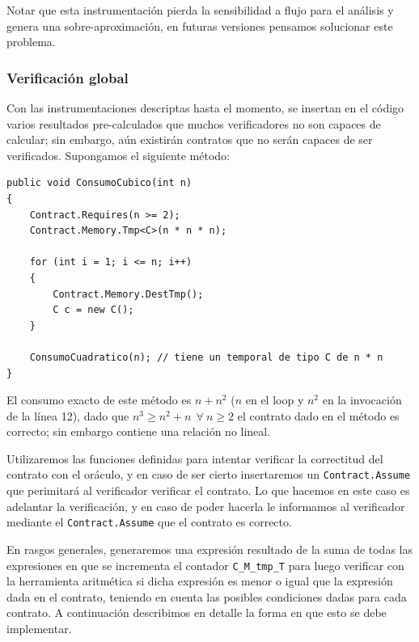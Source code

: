 \documentclass[12pt,a4paper]{article}
\newcommand\mono[1]{\texttt{#1}}
\begin{document}
				Notar que esta instrumentación pierda la sensibilidad a flujo para el análisis y genera una sobre-aproximación, en futuras versiones pensamos solucionar este problema.

			\subsubsection{Verificación global}
				Con las instrumentaciones descriptas hasta el momento, se insertan en el código varios resultados pre-calculados que muchos verificadores no son capaces de calcular; sin embargo, aún existirán contratos que no serán capaces de ser verificados. Supongamos el siguiente método:

				\vspace{15pt}
				\begin{small}
				\begin{lstlisting}[caption=Ejemplo de contrato no verificable por Code Contracts]
public void ConsumoCubico(int n)
{
	Contract.Requires(n >= 2);
	Contract.Memory.Tmp<C>(n * n * n);

	for (int i = 1; i <= n; i++)
	{
		Contract.Memory.DestTmp();
		C c = new C();
	}

	ConsumoCuadratico(n); // tiene un temporal de tipo C de n * n
}
				\end{lstlisting}
				\end{small}

				El consumo exacto de este método es $n + n^2$ ($n$ en el loop y $n^2$ en la invocación de la línea 12), dado que $n^3 \geq n^2 + n\ \ \forall\ n \geq 2$ el contrato dado en el método es correcto; sin embargo contiene una relación no lineal.

				Utilizaremos las funciones definidas para intentar verificar la correctitud del contrato con el oráculo, y en caso de ser cierto insertaremos un \mono{Contract.Assume} que perimitará al verificador verificar el contrato. Lo que hacemos en este caso es adelantar la verificación, y en caso de poder hacerla le informamos al verificador mediante el \mono{Contract.Assume} que el contrato es correcto.

				En rasgos generales, generaremos una expresión resultado de la suma de todas las expresiones en que se incrementa el contador \mono{C\_M\_tmp\_T} para luego verificar con la herramienta aritmética si dicha expresión es menor o igual que la expresión dada en el contrato, teniendo en cuenta las posibles condiciones dadas para cada contrato. A continuación describimos en detalle la forma en que esto se debe implementar.
\end{document}
